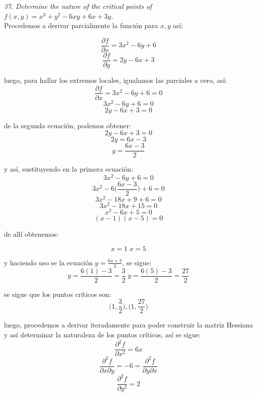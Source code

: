 \documentclass[a4paper,12pt]{article}
\begin{document}
\begin{itemize}
\end{itemize}


\textit{37. Determine the nature of the critical points of
			$f (x, y) = x^3 + y^2 - 6xy + 6x + 3y$.}\\

			Procedemos a derivar parcialmente la función para $x, y$ así:

				$$ \frac{\partial f}{\partial x} = 3x^2 - 6y + 6$$
				$$ \frac{\partial f}{\partial y} = 2y -6x + 3$$

			luego, para hallar los extremos locales, igualamos las parciales a cero, así:
				$$ \frac{\partial f}{\partial x} = 3x^2 - 6y + 6 = 0$$
				$$ 3x^2 - 6y + 6 = 0$$
				$$ 2y -6x + 3 = 0$$

			de la segunda ecuación, podemos obtener:
				$$  2y -6x + 3 = 0 $$
				$$  2y = 6x - 3 $$
				$$  y = \frac{6x - 3}{2} $$

			y así, sustituyendo en la primera ecuación:
				$$ 3x^2 - 6y + 6 = 0 $$
				$$ 3x^2 - 6\Big(\frac{6x - 3}{2}\Big) + 6 = 0 $$
				$$ 3x^2 - 18x + 9 + 6 = 0 $$
				$$ 3x^2 - 18x + 15 = 0 $$
				$$ x^2 - 6x + 5 = 0 $$
				$$ (x-1)(x-5) = 0 $$

			de allí obtenemos:

				$$ x = 1 \; x = 5$$

			y haciendo uso se la ecuación $ y = \frac{6x + 3}{2} $, se sigue:
				$$ y = \frac{6(1) - 3}{2} = \frac{3}{2} \; y = \frac{6(5) - 3}{2} = \frac{27}{2} $$

			se sigue que los puntos críticos son:
				$$ \Big( 1, \frac{3}{2} \Big), \Big( 1, \frac{27}{2} \Big)  $$

			luego, procedemos a derivar iteradamente para poder construir la matriz Hessiana
			y así determinar la naturaleza de los puntos críticos, así se sigue:
				$$ \frac{\partial^2 f}{\partial x^2} = 6x $$
				$$ \frac{\partial^2 f}{\partial x \partial y } = -6
				 = \frac{\partial^2 f}{\partial y \partial x } $$
				$$ \frac{\partial^2 f}{\partial y^2} = 2$$
\end{document}
